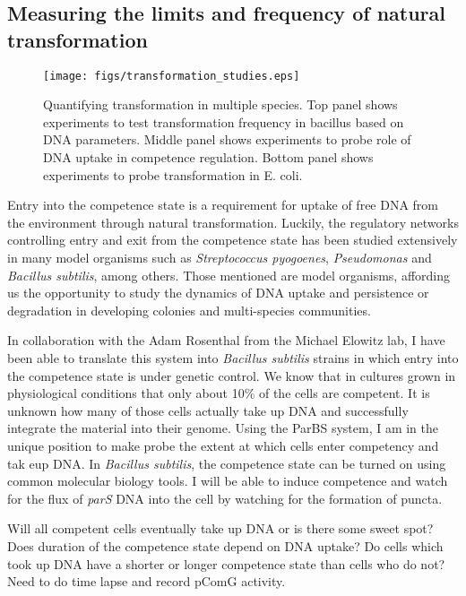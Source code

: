 \subsection*{Measuring the limits and frequency of natural transformation}

\begin{wrapfigure}{r}{0.4\textwidth}
	\centerline{\texttt{[image: figs/transformation\_studies.eps]}}
	\caption{Quantifying transformation in multiple species. Top panel shows
	experiments to test transformation frequency in bacillus based on DNA
parameters. Middle panel shows experiments to probe role of DNA uptake in
competence regulation. Bottom panel shows experiments to probe transformation in
E. coli.}
\label{fig:transformation_exp}
\end{wrapfigure}

Entry into the competence state is a requirement for uptake of free DNA from the
environment through natural transformation. Luckily, the regulatory networks
controlling entry and exit from the competence state has been studied
extensively in many model organisms such as \textit{Streptococcus
pyogoenes}\cite{Woodbury:2006dg}, \textit{Pseudomonas}\cite{Graupner:2001ii} and
\textit{Bacillus subtilis}\cite{Suel:2006ea,Suel:2007dm}, among others.  Those
mentioned are model organisms, affording us the opportunity to study the
dynamics of DNA uptake and persistence or degradation in developing colonies and
multi-species communities.

In collaboration with the Adam Rosenthal from the Michael Elowitz lab, I have
been able to translate this system into \textit{Bacillus subtilis} strains in
which entry into the competence state is under genetic control. We know that in cultures grown in
physiological conditions that only about 10\% of the cells are competent.  It
is unknown how many of those cells actually take up DNA and successfully
integrate the material into their genome. Using the ParBS system,  I am in the
unique position to make probe the extent at which cells enter competency and tak
eup DNA.  In \textit{Bacillus subtilis}, the
competence state can be turned on using common molecular biology tools. I will
be able to induce competence and watch for the flux of \textit{parS} DNA into
the cell by watching for the formation of puncta. 



Will all competent cells eventually take up DNA or is there some sweet spot?
Does duration of the competence state depend on DNA uptake? Do cells which took
up DNA have a shorter or longer competence state than cells who do not? Need to
do time lapse and record pComG activity. 

